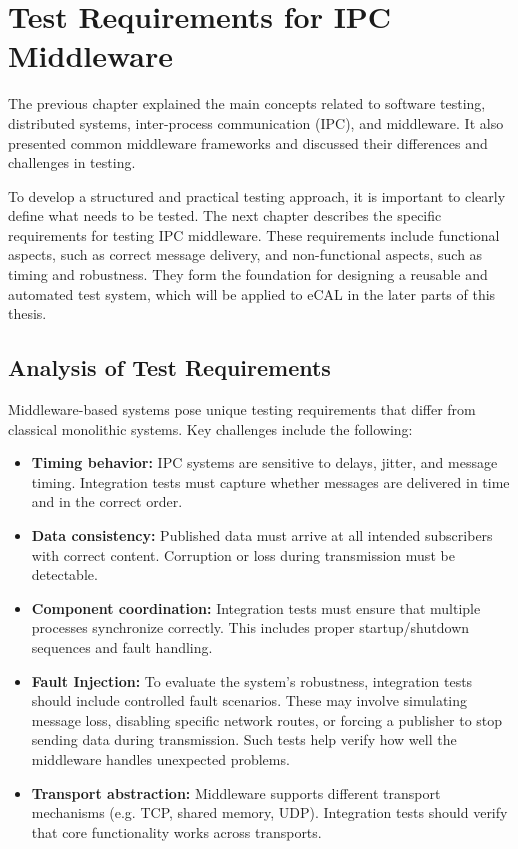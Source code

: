 \clearpage
{}

\section{Test Requirements for IPC Middleware}

The previous chapter explained the main concepts related to software testing, distributed systems, inter-process communication (IPC), and middleware. It also presented common middleware frameworks and discussed their differences and challenges in testing.

\vspace{1em}
To develop a structured and practical testing approach, it is important to clearly define what needs to be tested. The next chapter describes the specific requirements for testing IPC middleware. These requirements include functional aspects, such as correct message delivery, and non-functional aspects, such as timing and robustness. They form the foundation for designing a reusable and automated test system, which will be applied to eCAL in the later parts of this thesis.

\subsection{Analysis of Test Requirements}

Middleware-based systems pose unique testing requirements that differ from classical monolithic systems. Key challenges include the following:

\begin{itemize}
	\item \textbf{Timing behavior:} IPC systems are sensitive to delays, jitter, and message timing. Integration tests must capture whether messages are delivered in time and in the correct order.
	
	\item \textbf{Data consistency:} Published data must arrive at all intended subscribers with correct content. Corruption or loss during transmission must be detectable.
	
	\item \textbf{Component coordination:} Integration tests must ensure that multiple processes synchronize correctly. This includes proper startup/shutdown sequences and fault handling.
	
	\item \textbf{Fault Injection:} To evaluate the system’s robustness, integration tests should include controlled fault scenarios. These may involve simulating message loss, disabling specific network routes, or forcing a publisher to stop sending data during transmission. Such tests help verify how well the middleware handles unexpected problems.
	
	\item \textbf{Transport abstraction:} Middleware supports different transport mechanisms (e.g. TCP, shared memory, UDP). Integration tests should verify that core functionality works across transports.
\end{itemize}


